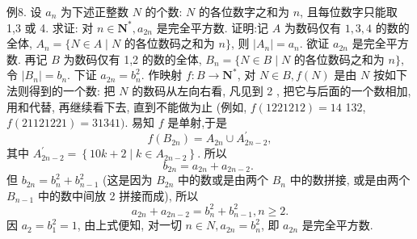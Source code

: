 例8. 设 $a_n$ 为下述正整数 $N$ 的个数: $N$ 的各位数字之和为 $n$, 且每位数字只能取 1,3 或 4. 求证: 对 $n \in \mathbf{N}^*, a_{2 n}$ 是完全平方数.
证明:记 $A$ 为数码仅有 $1,3,4$ 的数的全体, $A_n=\{N \in A \mid N$ 的各位数码之和为 $n\}$, 则 $\left|A_n\right|=a_n$. 欲证 $a_{2 n}$ 是完全平方数.
再记 $B$ 为数码仅有 1,2 的数的全体, $B_n=\{N \in B \mid N$ 的各位数码之和为 $n\}$, 令 $\left|B_n\right|=b_n$. 下证 $a_{2 n}=b_n^2$.
作映射 $f: B \rightarrow \mathbf{N}^*$, 对 $N \in B, f(N)$ 是由 $N$ 按如下法则得到的一个数: 把 $N$ 的数码从左向右看, 凡见到 2 , 把它与后面的一个数相加, 用和代替, 再继续看下去, 直到不能做为止 (例如, $f(1221212)=14$ 132, $f(21121221)= 31341)$. 易知 $f$ 是单射,于是
$$
f\left(B_{2 n}\right)=A_{2 n} \cup A_{2 n-2}^{\prime},
$$
其中 $A_{2 n-2}^{\prime}=\left\{10 k+2 \mid k \in A_{2 n-2}\right\}$. 所以
$$
b_{2 n}=a_{2 n}+a_{2 n-2} \text {. }
$$
但 $b_{2 n}=b_n^2+b_{n-1}^2$ (这是因为 $B_{2 n}$ 中的数或是由两个 $B_n$ 中的数拼接, 或是由两个 $B_{n-1}$ 中的数中间放 2 拼接而成), 所以
$$
a_{2 n}+a_{2 n-2}=b_n^2+b_{n-1}^2, n \geqslant 2 .
$$
因 $a_2=b_1^2=1$, 由上式便知, 对一切 $n \in N, a_{2 n}=b_n^2$, 即 $a_{2 n}$ 是完全平方数.


